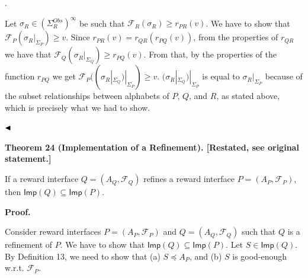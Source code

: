 \documentclass[10pt,a4paper]{article}
\begin{document}
 
 
\par{}. 
 
Let $\sigma_{R}\in(\Sigma_{R}^{Obs})^{\infty}$ be such that $\mathcal{F}_{R}(\sigma_{R})\geq r_{PR}(v)$. We have to show that $\mathcal{F}_{P}(\sigma_{R}|_{\Sigma_{P}})\geq v$. Since $r_{PR}(v)=r_{QR}(r_{PQ}(v))$, from the properties of $r_{QR}$ we have that $\mathcal{F}_{Q}(\sigma_{R}|_{\Sigma_{Q}})\geq r_{PQ}(v)$. From that, by the properties of the function $r_{PQ}$ we get $\mathcal{F}_{P}((\sigma_{R}|_{\Sigma_{Q}})|_{\Sigma_{P}})\geq v$. $(\sigma_{R}|_{\Sigma_{Q}})|_{\Sigma_{P}}$ is equal to $\sigma_{R}|_{\Sigma_{P}}$ because of the subset relationships between alphabets of $P$, $Q$, and $R$, as stated above, which is precisely what we had to show.\par
 
 
  
$\hfill\blacktriangleleft$\par
 
 
 
 
\par\medskip\noindent\textbf{Theorem 24 (Implementation of a Refinement). [Restated, see original statement.]}\par
 
 
If a reward interface $Q=(A_{Q},\mathcal{F}_{Q})$ refines a reward interface $P=(A_{P},\mathcal{F}_{P})$, then $\mathsf{Imp}(Q)\subseteq\mathsf{Imp}(P)$.\par
 
 
 
 
 
 
\par\medskip\noindent\textbf{Proof.}\par
 
 
Consider reward interfaces $P=(A_{P},\mathcal{F}_{P})$ and $Q=(A_{Q},\mathcal{F}_{Q})$ such that $Q$ is a refinement of $P$. We have to show that $\mathsf{Imp}(Q)\subseteq\mathsf{Imp}(P)$. Let $S\in\mathsf{Imp}(Q)$. By Definition 13, we need to show that (a) $S\preceq A_{P}$, and (b) $S$ is good-enough w.r.t. $\mathcal{F}_{P}$.\par
 
\end{document}
